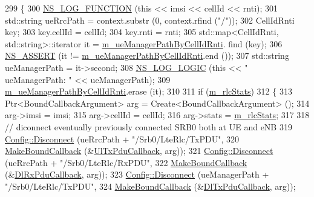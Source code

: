 \begin{DoxyCode}
299 \{
300   \hyperlink{log-macros-disabled_8h_a90b90d5bad1f39cb1b64923ea94c0761}{NS\_LOG\_FUNCTION} (\textcolor{keyword}{this} << imsi << cellId << rnti);
301   std::string ueRrcPath =  context.substr (0, context.rfind (\textcolor{stringliteral}{"/"}));
302   CellIdRnti key;
303   key.cellId = cellId;
304   key.rnti = rnti;
305   std::map<CellIdRnti, std::string>::iterator it = \hyperlink{classns3_1_1RadioBearerStatsConnector_aae236a1dedc73f04344d6d6bde132331}{m\_ueManagerPathByCellIdRnti}.
      find (key);
306   \hyperlink{assert_8h_a6dccdb0de9b252f60088ce281c49d052}{NS\_ASSERT} (it != \hyperlink{classns3_1_1RadioBearerStatsConnector_aae236a1dedc73f04344d6d6bde132331}{m\_ueManagerPathByCellIdRnti}.end ());
307   std::string ueManagerPath = it->second;  
308   \hyperlink{group__logging_ga88acd260151caf2db9c0fc84997f45ce}{NS\_LOG\_LOGIC} (\textcolor{keyword}{this} << \textcolor{stringliteral}{" ueManagerPath: "} << ueManagerPath);
309   \hyperlink{classns3_1_1RadioBearerStatsConnector_aae236a1dedc73f04344d6d6bde132331}{m\_ueManagerPathByCellIdRnti}.erase (it);
310 
311   \textcolor{keywordflow}{if} (\hyperlink{classns3_1_1RadioBearerStatsConnector_a25b5370b25e598c40f5d40d845ca072b}{m\_rlcStats})
312     \{
313       Ptr<BoundCallbackArgument> arg = Create<BoundCallbackArgument> ();
314       arg->imsi = imsi;
315       arg->cellId = cellId; 
316       arg->stats = \hyperlink{classns3_1_1RadioBearerStatsConnector_a25b5370b25e598c40f5d40d845ca072b}{m\_rlcStats};
317 
318       \textcolor{comment}{// diconnect eventually previously connected SRB0 both at UE and eNB}
319       \hyperlink{group__config_ga33e975bd2ed84e3353b2a3356d90fc1d}{Config::Disconnect} (ueRrcPath + \textcolor{stringliteral}{"/Srb0/LteRlc/TxPDU"},
320                           \hyperlink{group__makeboundcallback_ga1725d6362e6065faa0709f7c93f8d770}{MakeBoundCallback} (&\hyperlink{namespacens3_ae624428f0992ac62a3c5f2e7318fb98e}{UlTxPduCallback}, arg));
321       \hyperlink{group__config_ga33e975bd2ed84e3353b2a3356d90fc1d}{Config::Disconnect} (ueRrcPath + \textcolor{stringliteral}{"/Srb0/LteRlc/RxPDU"},
322                           \hyperlink{group__makeboundcallback_ga1725d6362e6065faa0709f7c93f8d770}{MakeBoundCallback} (&\hyperlink{namespacens3_ae4fb5123d8a56fce742428b530ec4197}{DlRxPduCallback}, arg));
323       \hyperlink{group__config_ga33e975bd2ed84e3353b2a3356d90fc1d}{Config::Disconnect} (ueManagerPath + \textcolor{stringliteral}{"/Srb0/LteRlc/TxPDU"},
324                           \hyperlink{group__makeboundcallback_ga1725d6362e6065faa0709f7c93f8d770}{MakeBoundCallback} (&\hyperlink{namespacens3_a7de82f7ed9986b9bcb67951f61e02ff4}{DlTxPduCallback}, arg));

\end{DoxyCode}
